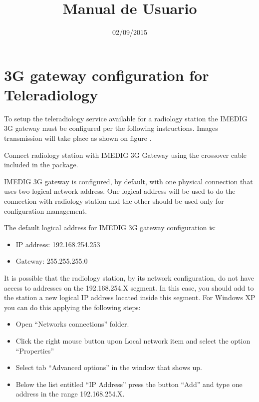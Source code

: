 \documentclass{plantilla-manual-usuario-en}
\title{Manual de Usuario}
\date{02/09/2015}
\begin{document}
\frontmatter

\maketitle

\newpage

\tableofcontents

\mainmatter

\section{3G gateway configuration for Teleradiology}

To setup the teleradiology service available for a radiology station the IMEDIG 3G gateway must be configured per the following instructions. Images transmission will take place as shown on figure .


Connect radiology station with IMEDIG 3G Gateway using the crossover cable included in the package. 

IMEDIG 3G gateway is configured, by default, with one physical connection that uses two logical network address. One logical address will be used to do the connection with radiology station and the other should be used only for configuration management.

The default logical address for IMEDIG 3G gateway configuration is:

\begin{itemize}
\item IP address: 192.168.254.253 
\item Gateway: 255.255.255.0
\end{itemize}

It is possible that the radiology station, by its network configuration, do not have access to addresses on the 192.168.254.X segment. In this case, you should add to the station a new logical IP address located inside this segment. For Windows XP you can do this applying the following steps: 

\begin{itemize}
\item Open ``Networks connections'' folder.
\item Click the right mouse button upon Local network item and select the option ``Properties''
\item Select tab ``Advanced options'' in the window that shows up.
\item Below the list entitled ``IP Address'' press the button ``Add'' and type one address in the range 192.168.254.X.
\end{itemize}
\end{document}
